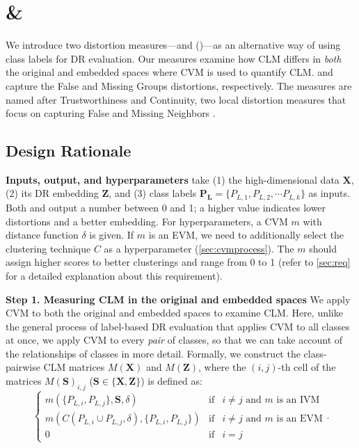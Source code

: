 \section{\LS \& \LC}

\label{sec:lsc}

We introduce two distortion measures---\LT and \LC (\lsc)---as an alternative way of using class labels for DR evaluation. 
Our measures examine how CLM differs in \textit{both} the original and embedded spaces where CVM is used to quantify CLM.
\lt and \lc capture the False and Missing Groups distortions, respectively. 
The measures are named after Trustworthiness and Continuity, two local distortion measures that focus on capturing False and Missing Neighbors \cite{venna06nn}.


\subsection{Design Rationale}

\label{sec:overcom}

\noindent
\textbf{Inputs, output, and hyperparameters} \ltc take (1) the high-dimensional data $\mathbf{X}$, (2) its DR embedding $\mathbf{Z}$, and (3) class labels $\mathbf{\mathbf{P}_L} = \{P_{L,1}, P_{L,2}, \cdots P_{L,k} \}$ as inputs. Both \lt and \lc output a number between 0 and 1; a higher value indicates lower distortions and a better embedding. For hyperparameters, a CVM $m$ with distance function $\delta$ is given. If $m$ is an EVM, we need to additionally select the clustering technique $C$ as a hyperparameter (\autoref{sec:cvmprocess}). The $m$ should assign higher scores to better clusterings and range from 0 to 1 (refer to \autoref{sec:req} for a detailed explanation about this requirement). 

\noindent
\textbf{Step 1. Measuring CLM in the original and embedded spaces}
We apply CVM to both the original and embedded spaces to examine CLM. Here, unlike the general process of label-based DR evaluation that applies CVM to all classes at once, we apply CVM to every \textit{pair} of classes, so that we can take account of the relationships of classes in more detail.
Formally, we construct the class-pairwise CLM matrices $M(\mathbf{X})$ and $M(\mathbf{Z})$, where the $(i, j)$-th cell of the matrices $M(\mathbf{S})_{i,j}$ ($\mathbf{S} \in \{\mathbf{X}, \mathbf{Z}\}$) is defined as:
\[
\left\{
\begin{array}{rcl} 
m(\{P_{L, i}, P_{L, j}\}, \mathbf{S}, \delta) & \text{if} & i \neq j \text{ and $m$ is an IVM} \\ 
m(C(P_{L, i} \cup P_{L, j}, \delta), \{P_{L, i}, P_{L, j}\}) & \text{if} & i \neq j \text{ and $m$ is an EVM} \\
0 & \text{if} & i=j 
\end{array}
\right..
\]


